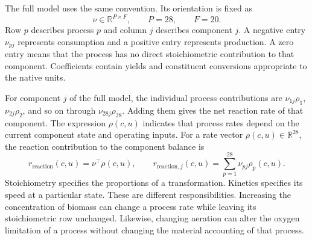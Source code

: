The full model uses the same convention. Its orientation is fixed as
\begin{equation}
\nu\in\mathbb{R}^{P\times F},\qquad P=28,\qquad F=20.
\label{eq:petersen_orientation}
\end{equation}
Row $p$ describes process $p$ and column $j$ describes component $j$. A negative entry $\nu_{pj}$ represents consumption and a positive entry represents production. A zero entry means that the process has no direct stoichiometric contribution to that component. Coefficients contain yields and constituent conversions appropriate to the native units.

For component $j$ of the full model, the individual process contributions are $\nu_{1j}\rho_1$, $\nu_{2j}\rho_2$, and so on through $\nu_{28j}\rho_{28}$. Adding them gives the net reaction rate of that component. The expression $\rho(c,u)$ indicates that process rates depend on the current component state and operating inputs. For a rate vector $\rho(c,u)\in\mathbb{R}^{28}$, the reaction contribution to the component balance is
\begin{equation}
r_{\mathrm{reaction}}(c,u)=\nu^\top\rho(c,u),\qquad
r_{\mathrm{reaction},j}(c,u)=\sum_{p=1}^{28}\nu_{pj}\rho_p(c,u).
\label{eq:reaction_contribution}
\end{equation}
Stoichiometry specifies the proportions of a transformation. Kinetics specifies its speed at a particular state. These are different responsibilities. Increasing the concentration of biomass can change a process rate while leaving its stoichiometric row unchanged. Likewise, changing aeration can alter the oxygen limitation of a process without changing the material accounting of that process.

